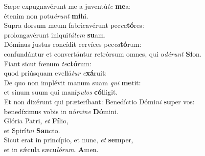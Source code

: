 \evenverse Sæpe expugnavérunt me a juventú\textit{te} \textbf{me}a:~\*\\
\evenverse étenim non potu\textit{é}\textit{runt} \textbf{mi}hi.\\
\oddverse Supra dorsum meum fabricavérunt pec\textit{ca}\textbf{tó}res:~\*\\
\oddverse prolongavérunt iniqui\textit{tá}\textit{tem} \textbf{su}am.\\
\evenverse Dóminus justus concídit cervíces pec\textit{ca}\textbf{tó}rum:~\*\\
\evenverse confundántur et convertántur retrórsum omnes, qui o\textit{dé}\textit{runt} \textbf{Si}on.\\
\oddverse Fiant sicut fœnum \textit{te}\textbf{ctó}rum:~\*\\
\oddverse quod priúsquam evellá\textit{tur} \textit{e}\textbf{xá}ruit:\\
\evenverse De quo non implévit manum suam \textit{qui} \textbf{me}tit:~\*\\
\evenverse et sinum suum qui maní\textit{pu}\textit{los} \textbf{cól}ligit.\\
\oddverse Et non dixérunt qui præteríbant: Benedíctio Dómi\textit{ni} \textbf{su}per vos:~\*\\
\oddverse benedíximus vobis in nó\textit{mi}\textit{ne} \textbf{Dó}mini.\\
\evenverse Glória Patri, \textit{et} \textbf{Fí}lio,~\*\\
\evenverse et Spirí\textit{tu}\textit{i} \textbf{San}cto.\\
\oddverse Sicut erat in princípio, et nunc, \textit{et} \textbf{sem}per,~\*\\
\oddverse et in sǽcula sæcu\textit{ló}\textit{rum}. \textbf{A}men.\\
